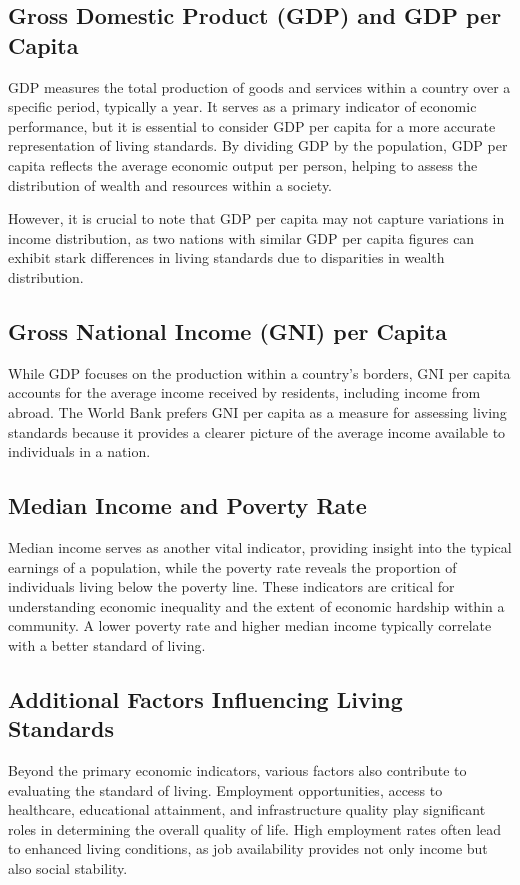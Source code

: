 \documentclass[12pt]{article}
\begin{document}
\subsection{Gross Domestic Product (GDP) and GDP per Capita}
GDP measures the total production of goods and services within a country over a specific period, typically a year. It serves as a primary indicator of economic performance, but it is essential to consider GDP per capita for a more accurate representation of living standards. By dividing GDP by the population, GDP per capita reflects the average economic output per person, helping to assess the distribution of wealth and resources within a society.

However, it is crucial to note that GDP per capita may not capture variations in income distribution, as two nations with similar GDP per capita figures can exhibit stark differences in living standards due to disparities in wealth distribution.

\subsection{Gross National Income (GNI) per Capita}
While GDP focuses on the production within a country's borders, GNI per capita accounts for the average income received by residents, including income from abroad. The World Bank prefers GNI per capita as a measure for assessing living standards because it provides a clearer picture of the average income available to individuals in a nation.

\subsection{Median Income and Poverty Rate}
Median income serves as another vital indicator, providing insight into the typical earnings of a population, while the poverty rate reveals the proportion of individuals living below the poverty line. These indicators are critical for understanding economic inequality and the extent of economic hardship within a community. A lower poverty rate and higher median income typically correlate with a better standard of living.

\subsection{Additional Factors Influencing Living Standards}
Beyond the primary economic indicators, various factors also contribute to evaluating
the standard of living. Employment opportunities, access to healthcare, educational
attainment, and infrastructure quality play significant roles in determining the overall
quality of life. High employment rates often lead to enhanced living conditions, as job
availability provides not only income but also social stability.
\end{document}
